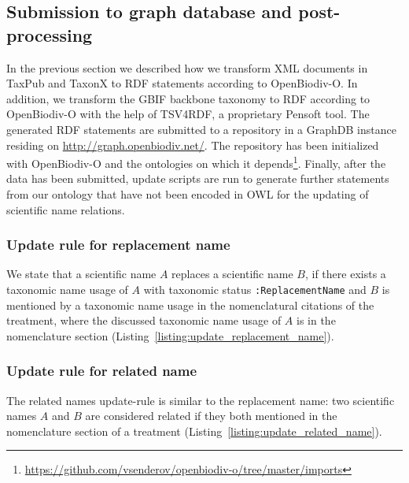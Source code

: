 \subsection{Submission to graph database and post-processing}

In the previous section we described how we transform XML documents in TaxPub and TaxonX to RDF statements according to OpenBiodiv-O. In addition, we transform the GBIF backbone taxonomy to RDF according to OpenBiodiv-O with the help of TSV4RDF, a proprietary Pensoft tool. The generated RDF statements are submitted to a repository in a GraphDB instance residing on \url{http://graph.openbiodiv.net/}. The repository has been initialized with OpenBiodiv-O and the ontologies on which it depends\footnote{\url{https://github.com/vsenderov/openbiodiv-o/tree/master/imports}}. Finally, after the data has been submitted, update scripts are run to generate further statements from our ontology that have not been encoded in OWL for the updating of scientific name relations.

\subsubsection{Update rule for replacement name}

We state that a scientific name $A$ replaces a scientific name $B$, if there exists a taxonomic name usage of $A$ with taxonomic status {\tt :ReplacementName} and $B$ is mentioned by a taxonomic name usage in the nomenclatural citations of the treatment, where the discussed taxonomic name usage of $A$ is in the nomenclature section (Listing~\ref{listing:update_replacement_name}).



\subsubsection{Update rule for related name}

The related names update-rule is similar to the replacement name: two scientific names $A$ and $B$ are considered related if they both mentioned in the nomenclature section of a treatment (Listing~\ref{listing:update_related_name}).



